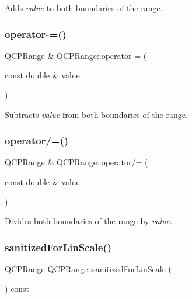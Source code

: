 Adds {\itshape value} to both boundaries of the range. \hypertarget{class_q_c_p_range_a95894bcb15a16a75ca564091374e2191}{}\label{class_q_c_p_range_a95894bcb15a16a75ca564091374e2191} 
\subsubsection{\texorpdfstring{operator-\/=()}{operator-=()}}
{\footnotesize\ttfamily \hyperlink{class_q_c_p_range}{Q\+C\+P\+Range} \& Q\+C\+P\+Range\+::operator-\/= (\begin{DoxyParamCaption}\item[{const double \&}]{value }\end{DoxyParamCaption})\hspace{0.3cm}{\ttfamily [inline]}}

Subtracts {\itshape value} from both boundaries of the range. \hypertarget{class_q_c_p_range_a6137d8682b6835ace840730b4c1e2d63}{}\label{class_q_c_p_range_a6137d8682b6835ace840730b4c1e2d63} 
\subsubsection{\texorpdfstring{operator/=()}{operator/=()}}
{\footnotesize\ttfamily \hyperlink{class_q_c_p_range}{Q\+C\+P\+Range} \& Q\+C\+P\+Range\+::operator/= (\begin{DoxyParamCaption}\item[{const double \&}]{value }\end{DoxyParamCaption})\hspace{0.3cm}{\ttfamily [inline]}}

Divides both boundaries of the range by {\itshape value}. \hypertarget{class_q_c_p_range_a808751fdd9b17ef52327ba011df2e5f1}{}\label{class_q_c_p_range_a808751fdd9b17ef52327ba011df2e5f1} 
\subsubsection{\texorpdfstring{sanitized\+For\+Lin\+Scale()}{sanitizedForLinScale()}}
{\footnotesize\ttfamily \hyperlink{class_q_c_p_range}{Q\+C\+P\+Range} Q\+C\+P\+Range\+::sanitized\+For\+Lin\+Scale (\begin{DoxyParamCaption}{ }\end{DoxyParamCaption}) const}

